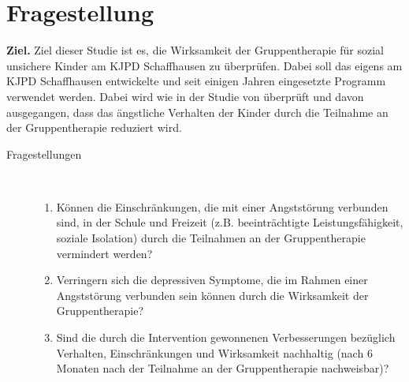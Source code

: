 %
%
\chapter{Fragestellung}\label{chap.fragestellung}
\glsresetall
\textbf{Ziel.} Ziel dieser Studie ist es, die Wirksamkeit der Gruppentherapie für sozial unsichere Kinder am KJPD Schaffhausen zu überprüfen. Dabei soll das eigens am KJPD Schaffhausen entwickelte und seit einigen Jahren eingesetzte Programm verwendet werden. Dabei wird wie in der Studie von  überprüft und davon ausgegangen, dass das ängstliche Verhalten der Kinder durch die Teilnahme an der Gruppentherapie reduziert wird.

\begin{description}
  \item[Fragestellungen]~\par
  \begin{enumerate}
      \item Können die Einschränkungen, die mit einer Angststörung verbunden sind, in der Schule und Freizeit (z.B. beeinträchtigte Leistungsfähigkeit, soziale Isolation) durch die Teilnahmen an der Gruppentherapie vermindert werden?
      \item Verringern sich die depressiven Symptome, die im Rahmen einer Angststörung verbunden sein können \cite{Essau:2002} durch die Wirksamkeit der Gruppentherapie?
      \item Sind die durch die Intervention gewonnenen Verbesserungen bezüglich Verhalten, Einschränkungen und Wirksamkeit nachhaltig (nach 6 Monaten nach der Teilnahme an der Gruppentherapie nachweisbar)?
  \end{enumerate}
\end{description}  

